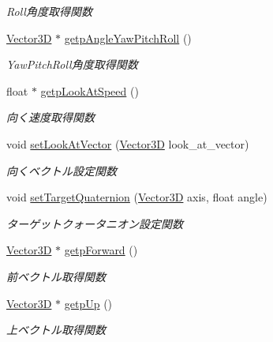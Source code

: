 \begin{DoxyCompactItemize}
\begin{DoxyCompactList}\small\item\em Roll角度取得関数 \end{DoxyCompactList}\item 
\mbox{\hyperlink{class_vector3_d}{Vector3D}} $\ast$ \mbox{\hyperlink{class_transform_aadf052a769af0793916a25c88d00640c}{getp\+Angle\+Yaw\+Pitch\+Roll}} ()
\begin{DoxyCompactList}\small\item\em Yaw\+Pitch\+Roll角度取得関数 \end{DoxyCompactList}\item 
float $\ast$ \mbox{\hyperlink{class_transform_a812895ad4ebc4c713ece357167733418}{getp\+Look\+At\+Speed}} ()
\begin{DoxyCompactList}\small\item\em 向く速度取得関数 \end{DoxyCompactList}\item 
void \mbox{\hyperlink{class_transform_a7a90095a66990f9e17b22c141dbe1379}{set\+Look\+At\+Vector}} (\mbox{\hyperlink{class_vector3_d}{Vector3D}} look\+\_\+at\+\_\+vector)
\begin{DoxyCompactList}\small\item\em 向くベクトル設定関数 \end{DoxyCompactList}\item 
void \mbox{\hyperlink{class_transform_aa2d0352ed37603f7a80a8562ade5bcbe}{set\+Target\+Quaternion}} (\mbox{\hyperlink{class_vector3_d}{Vector3D}} axis, float angle)
\begin{DoxyCompactList}\small\item\em ターゲットクォータニオン設定関数 \end{DoxyCompactList}\item 
\mbox{\hyperlink{class_vector3_d}{Vector3D}} $\ast$ \mbox{\hyperlink{class_transform_aa01e95eff5d3bb0a2df9d81faa229143}{getp\+Forward}} ()
\begin{DoxyCompactList}\small\item\em 前ベクトル取得関数 \end{DoxyCompactList}\item 
\mbox{\hyperlink{class_vector3_d}{Vector3D}} $\ast$ \mbox{\hyperlink{class_transform_a98796d7ad6726567b5b12ab65254a79d}{getp\+Up}} ()
\begin{DoxyCompactList}\small\item\em 上ベクトル取得関数 \end{DoxyCompactList}\item 

\end{DoxyCompactItemize}
